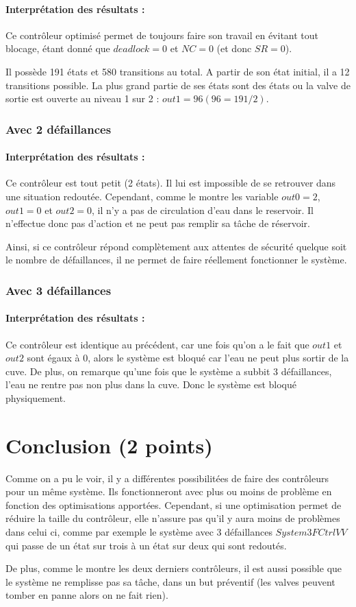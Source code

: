 \documentclass[a4paper]{book}
\begin{document}
\paragraph{Interprétation des résultats : }
Ce contrôleur optimisé permet de toujours faire son travail en évitant tout blocage, étant donné que $deadlock = 0$ et $NC = 0$ (et donc $SR=0$).

Il possède 191 états et 580 transitions au total. A partir de son état initial, il a 12 transitions possible.
La plus grand partie de ses états sont des états ou la valve de sortie est ouverte au niveau 1 sur 2 : $out1 = 96 (96 = 191/2)$.

\subsubsection{Avec 2 défaillances}

\paragraph{Interprétation des résultats :}
Ce contrôleur est tout petit (2 états). Il lui est impossible de se retrouver dans une situation redoutée. Cependant, comme le montre les variable $out0=2$, $out1=0$ et $out2=0$, il n'y a pas de circulation d'eau dans le reservoir.
Il n'effectue donc pas d'action et ne peut pas remplir sa tâche de réservoir.

Ainsi, si ce contrôleur répond complètement aux attentes de sécurité quelque soit le nombre de défaillances, il ne permet de faire réellement fonctionner le système.


\subsubsection{Avec 3 défaillances}

\paragraph{Interprétation des résultats :}
Ce contrôleur est identique au précédent, car une fois qu'on a le fait que $out1$ et $out2$ sont égaux à $0$, alors le système est bloqué car l'eau ne peut plus sortir de la cuve.
De plus, on remarque qu'une fois que le système a subbit 3 défaillances, l'eau ne rentre pas non plus dans la cuve. Donc le système est bloqué physiquement.

\pagebreak
\section{Conclusion (2 points)}
Comme on a pu le voir, il y a différentes possibilitées de faire des contrôleurs pour un même système. Ils fonctionneront avec plus ou moins de problème en fonction des optimisations apportées.
Cependant, si une optimisation permet de réduire la taille du contrôleur, elle n'assure pas qu'il y aura moins de problèmes dans celui ci, comme par exemple le système avec 3 défaillances  $System3FCtrlVV$ qui passe de un état sur trois à un état sur deux qui sont redoutés.

De plus, comme le montre les deux derniers contrôleurs, il est aussi possible que le système ne remplisse pas sa tâche, dans un but préventif (les valves peuvent tomber en panne alors on ne fait rien).
\end{document}
